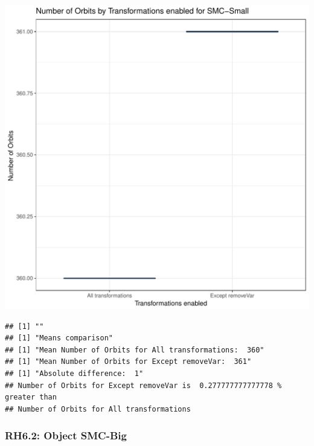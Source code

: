 \documentclass{article}\usepackage[]{graphicx}\usepackage[]{color}
\makeatletter
\def\maxwidth{ %
  \ifdim\Gin@nat@width>\linewidth
    \linewidth
  \else
    \Gin@nat@width
  \fi
}
\newenvironment{kframe}{%
 \def\at@end@of@kframe{}%
 \ifinner\ifhmode%
  \def\at@end@of@kframe{\end{minipage}}%
  \begin{minipage}{\columnwidth}%
 \fi\fi%
 \def\FrameCommand##1{\hskip\@totalleftmargin \hskip-\fboxsep
 \colorbox{shadecolor}{##1}\hskip-\fboxsep
     \hskip-\linewidth \hskip-\@totalleftmargin \hskip\columnwidth}%
 \MakeFramed {\advance\hsize-\width
   \@totalleftmargin\z@ \linewidth\hsize
   \@setminipage}}%
 {\par\unskip\endMakeFramed%
 \at@end@of@kframe}
\newenvironment{knitrout}{}{} %
\makeatother
\begin{document}
\begin{knitrout}
\color{fgcolor}
\includegraphics[width=\maxwidth]{figure/RH6_small-1} 
\begin{kframe}

{\ttfamily\noindent\bfseries\color{errorcolor}{\#\# Error in eval(expr, envir, enclos): object 'shap\_cashew\_small' not found}}\begin{verbatim}
## [1] ""
## [1] "Means comparison"
## [1] "Mean Number of Orbits for All transformations:  360"
## [1] "Mean Number of Orbits for Except removeVar:  361"
## [1] "Absolute difference:  1"
## Number of Orbits for Except removeVar is  0.277777777777778 % greater than 
## Number of Orbits for All transformations
\end{verbatim}
\end{kframe}
\end{knitrout}


\subsubsection{RH6.2: Object SMC-Big}
\end{document}
